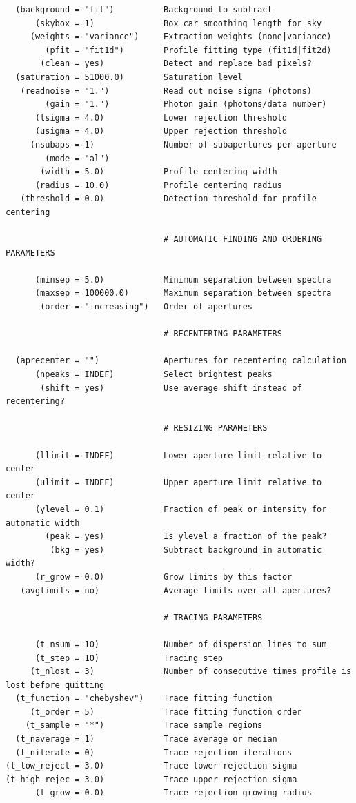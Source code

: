 \begin{verbatim}
  (background = "fit")          Background to subtract
      (skybox = 1)              Box car smoothing length for sky
     (weights = "variance")     Extraction weights (none|variance)
        (pfit = "fit1d")        Profile fitting type (fit1d|fit2d)
       (clean = yes)            Detect and replace bad pixels?
  (saturation = 51000.0)        Saturation level
   (readnoise = "1.")           Read out noise sigma (photons)
        (gain = "1.")           Photon gain (photons/data number)
      (lsigma = 4.0)            Lower rejection threshold
      (usigma = 4.0)            Upper rejection threshold
     (nsubaps = 1)              Number of subapertures per aperture
        (mode = "al")
       (width = 5.0)            Profile centering width
      (radius = 10.0)           Profile centering radius
   (threshold = 0.0)            Detection threshold for profile centering

                                # AUTOMATIC FINDING AND ORDERING PARAMETERS

      (minsep = 5.0)            Minimum separation between spectra
      (maxsep = 100000.0)       Maximum separation between spectra
       (order = "increasing")   Order of apertures

                                # RECENTERING PARAMETERS

  (aprecenter = "")             Apertures for recentering calculation
      (npeaks = INDEF)          Select brightest peaks
       (shift = yes)            Use average shift instead of recentering?

                                # RESIZING PARAMETERS

      (llimit = INDEF)          Lower aperture limit relative to center
      (ulimit = INDEF)          Upper aperture limit relative to center
      (ylevel = 0.1)            Fraction of peak or intensity for automatic width
        (peak = yes)            Is ylevel a fraction of the peak?
         (bkg = yes)            Subtract background in automatic width?
      (r_grow = 0.0)            Grow limits by this factor
   (avglimits = no)             Average limits over all apertures?

                                # TRACING PARAMETERS

      (t_nsum = 10)             Number of dispersion lines to sum
      (t_step = 10)             Tracing step
     (t_nlost = 3)              Number of consecutive times profile is lost before quitting
  (t_function = "chebyshev")    Trace fitting function
     (t_order = 5)              Trace fitting function order
    (t_sample = "*")            Trace sample regions
  (t_naverage = 1)              Trace average or median
  (t_niterate = 0)              Trace rejection iterations
(t_low_reject = 3.0)            Trace lower rejection sigma
(t_high_rejec = 3.0)            Trace upper rejection sigma
      (t_grow = 0.0)            Trace rejection growing radius


\end{verbatim}
